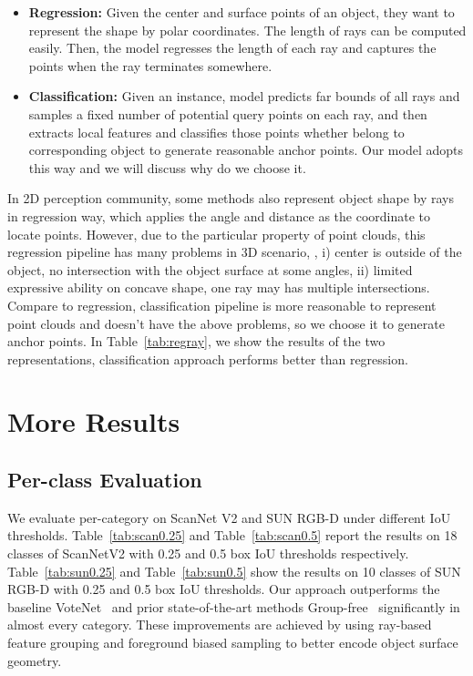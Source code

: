 \documentclass[final]{cvpr}
\begin{document}
\begin{itemize}[leftmargin=*]
	\setlength{\itemsep}{0pt}
	\setlength{\parsep}{-2pt}
	\setlength{\parskip}{-0pt}
    \setlength{\leftmargin}{-10pt}
	
	\item \textbf{Regression:} Given the center and surface points of an object, they want to represent the shape by polar coordinates. The length of  rays can be computed easily. Then, the model regresses the length of each ray and captures the points when the ray terminates somewhere. 
	\item \textbf{Classification:} Given an instance, model predicts far bounds of all rays and samples a fixed number of potential query points on each ray, and then extracts local features and classifies those points whether belong to corresponding object to generate reasonable anchor points. Our model adopts this way and we will discuss why do we choose it.
\end{itemize}
In 2D perception community, some methods also represent object shape by rays~\cite{xie2020polarmask, xu2019explicit} in regression way, which applies the angle and distance as the coordinate to locate points. 
However, due to the particular property of point clouds, this regression pipeline has many problems in 3D scenario, \ie, i) center is outside of the object, no intersection with the object surface at some angles, ii) limited expressive ability on concave shape, one ray may has multiple intersections. Compare to regression, classification pipeline is more reasonable to represent point clouds and doesn't have the above problems, so we choose it to generate anchor points. In Table~\ref{tab:regray}, we show the results of the two representations, classification approach performs better than regression. 

\section{More Results}\label{sec:more}
\subsection{Per-class Evaluation} \label{sec:perclass}
We evaluate per-category on ScanNet V2 and SUN RGB-D under different IoU thresholds. Table~\ref{tab:scan0.25} and Table~\ref{tab:scan0.5} report the results on 18 classes of ScanNetV2 with 0.25 and 0.5 box IoU thresholds respectively. Table~\ref{tab:sun0.25} and Table~\ref{tab:sun0.5} show the results on 10 classes of SUN RGB-D with 0.25 and 0.5 box IoU thresholds. Our approach outperforms the baseline VoteNet~\cite{qi2019deep} and prior state-of-the-art methods Group-free~\cite{liu2021group} significantly in almost every category. These improvements are achieved by using ray-based feature grouping and foreground biased sampling to better encode object surface geometry.
\end{document}
